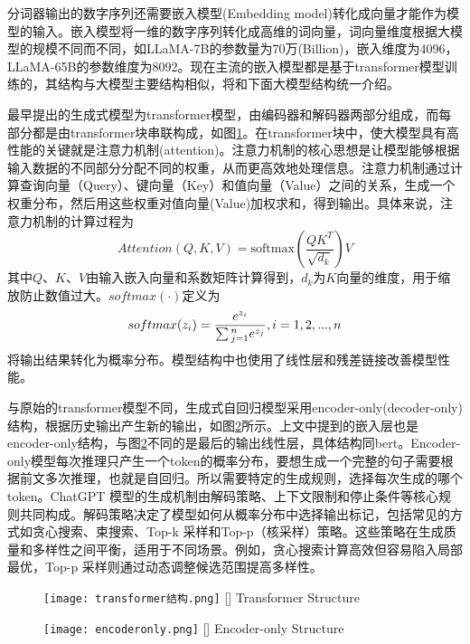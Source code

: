 分词器输出的数字序列还需要嵌入模型(Embedding model)转化成向量才能作为模型的输入。嵌入模型将一维的数字序列转化成高维的词向量，词向量维度根据大模型的规模不同而不同，如LLaMA-7B的参数量为70万(Billion)，嵌入维度为4096，LLaMA-65B的参数维度为8092。现在主流的嵌入模型都是基于transformer\cite{devlin2019bert}模型训练的，其结构与大模型主要结构相似，将和下面大模型结构统一介绍。

最早提出的生成式模型为transformer\cite{vaswani2017attention}模型，由编码器和解码器两部分组成，而每部分都是由transformer块串联构成，如图\ref{fig:transformer}。在transformer块中，使大模型具有高性能的关键就是注意力机制(attention)。注意力机制的核心思想是让模型能够根据输入数据的不同部分分配不同的权重，从而更高效地处理信息。注意力机制通过计算查询向量（Query）、键向量（Key）和值向量（Value）之间的关系，生成一个权重分布，然后用这些权重对值向量(Value)加权求和，得到输出。具体来说，注意力机制的计算过程为
\begin{equation}
  \label{eq:attention}
  Attention(Q,K,V) = \text{softmax}\left(\frac{QK^T}{\sqrt{d_k}}\right)V
\end{equation}
其中$Q$、$K$、$V$由输入嵌入向量和系数矩阵计算得到，$d_k$为$K$向量的维度，用于缩放防止数值过大。$softmax(\cdot )$定义为
\begin{equation}
  \label{eq:softmax}
  softmax({z_i}) = \frac{{{e^{{z_i}}}}}{{\sum {_{j = 1}^n{e^{{z_j}}}} }},{\rm{  }}i = 1,2,...,n
\end{equation}
将输出结果转化为概率分布。模型结构中也使用了线性层和残差链接\cite{he2016deep}改善模型性能。

与原始的transformer模型不同，生成式自回归模型采用encoder-only(decoder-only)结构，根据历史输出产生新的输出，如图\ref{fig:encodel}所示。上文中提到的嵌入层也是encoder-only结构，与图\ref{fig:encodel}不同的是最后的输出线性层，具体结构同bert\cite{devlin2019bert}。Encoder-only模型每次推理只产生一个token的概率分布，要想生成一个完整的句子需要根据前文多次推理，也就是自回归。所以需要特定的生成规则，选择每次生成的哪个token。ChatGPT 模型的生成机制由解码策略、上下文限制和停止条件等核心规则共同构成。解码策略决定了模型如何从概率分布中选择输出标记，包括常见的方式如贪心搜索\cite{bahdanau2015neural}、束搜索\cite{sutskever2014sequence}、Top-k\cite{fan2018hierarchical} 采样和Top-p（核采样）\cite{holtzmancurious}策略。这些策略在生成质量和多样性之间平衡，适用于不同场景。例如，贪心搜索计算高效但容易陷入局部最优，Top-p 采样则通过动态调整候选范围提高多样性。
\begin{figure}[htbp]
  \centering
  \texttt{[image: transformer结构.png]}
  []{ Transformer Structure}
  \label{fig:transformer}
\end{figure}
\begin{figure}[!htbp]
  \centering
  \texttt{[image: encoderonly.png]}
  []{ Encoder-only Structure}
  \label{fig:encodel}
\end{figure}


